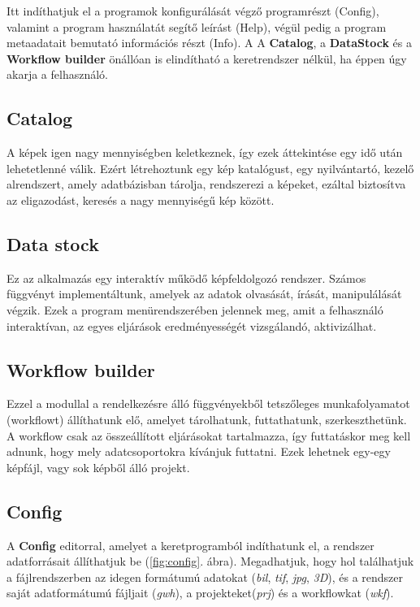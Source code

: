 \documentclass[a4paper,12pt]{article}
\begin{document}
Itt indíthatjuk el a programok konfigurálását végző programrészt (Config), valamint a program használatát segítő leírást (Help), végül pedig a program metaadatait bemutató információs részt (Info).
A A \textbf{Catalog}, a \textbf{DataStock} és a \textbf{Workflow builder} önállóan is elindítható a keretrendszer nélkül, ha éppen úgy akarja a felhasználó.

\subsection{Catalog}

A képek igen nagy mennyiségben keletkeznek, így ezek áttekintése egy idő után lehetetlenné válik. Ezért létrehoztunk egy kép katalógust, egy nyilvántartó, kezelő alrendszert, amely adatbázisban tárolja, rendszerezi a képeket, ezáltal biztosítva az eligazodást, keresés a nagy mennyiségű kép között.

\subsection{Data stock}

Ez az alkalmazás egy interaktív működő képfeldolgozó rendszer. Számos függvényt implementáltunk, amelyek az adatok olvasását, írását, manipulálását végzik. Ezek a program menürendszerében jelennek meg, amit a felhasználó interaktívan, az egyes eljárások eredményességét vizsgálandó, aktivizálhat.


\subsection{Workflow builder}

Ezzel a modullal a rendelkezésre álló függvényekből tetszőleges munkafolyamatot (workflowt) állíthatunk elő, amelyet tárolhatunk, futtathatunk, szerkeszthetünk. A workflow csak az összeállított eljárásokat tartalmazza, így futtatáskor meg kell adnunk, hogy mely adatcsoportokra kívánjuk futtatni. Ezek lehetnek egy-egy képfájl, vagy sok képből álló projekt.


\subsection{Config}

A \textbf{Config} editorral, amelyet a keretprogramból indíthatunk el, a rendszer adatforrásait állíthatjuk be (\ref{fig:config}. ábra). Megadhatjuk, hogy hol találhatjuk a fájlrendszerben az idegen formátumú adatokat (\textit{bil}, \textit{tif}, \textit{jpg}, \textit{3D}), és a rendszer saját adatformátumú fájljait (\textit{gwh}), a projekteket(\textit{prj}) és a workflowkat (\textit{wkf}). 
 
\end{document}
